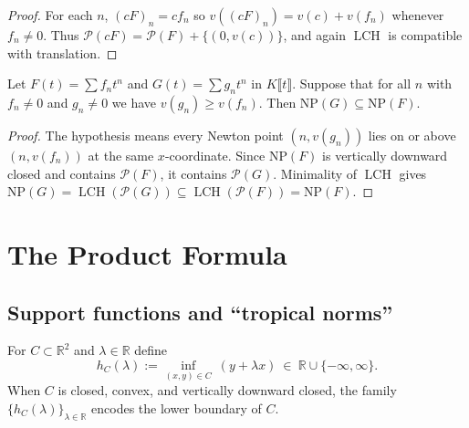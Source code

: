 \begin{proof}
  \leanok
  For each $n$, $(cF)_n=c f_n$ so $v((cF)_n)=v(c)+v(f_n)$ whenever $f_n\neq 0$.
  Thus $\mathcal{P}(cF)=\mathcal{P}(F)+\{(0,v(c))\}$, and again $\operatorname{LCH}$ is compatible with translation.
\end{proof}

\begin{lemma}
  \label{lem:newton_polygon_monotone}
  \leanok
  Let $F(t)=\sum f_n t^n$ and $G(t)=\sum g_n t^n$ in $K\llbracket t\rrbracket$.
  Suppose that for all $n$ with $f_n\neq 0$ and $g_n\neq 0$ we have $v(g_n)\ge v(f_n)$.
  Then $\mathrm{NP}(G)\subseteq \mathrm{NP}(F)$.
\end{lemma}

\begin{proof}
  \leanok
  The hypothesis means every Newton point $(n,v(g_n))$ lies on or above $(n,v(f_n))$ at the same $x$-coordinate.
  Since $\mathrm{NP}(F)$ is vertically downward closed and contains $\mathcal{P}(F)$, it contains $\mathcal{P}(G)$.
  Minimality of $\operatorname{LCH}$ gives $\mathrm{NP}(G)=\operatorname{LCH}(\mathcal{P}(G))\subseteq \operatorname{LCH}(\mathcal{P}(F))=\mathrm{NP}(F)$.
\end{proof}

\section{The Product Formula}

\subsection{Support functions and “tropical norms”}

\begin{definition}
  \label{def:support_function_lower}
  \leanok
  \uses{}
  For $C\subset\mathbb{R}^2$ and $\lambda\in\mathbb{R}$ define
  \[
    h_C(\lambda) := \inf_{(x,y)\in C}\ (y+\lambda x)\ \in\ \mathbb{R}\cup\{-\infty,\infty\}.
  \]
  When $C$ is closed, convex, and vertically downward closed, the family $\{h_C(\lambda)\}_{\lambda\in\mathbb{R}}$
  encodes the lower boundary of $C$.
\end{definition}

